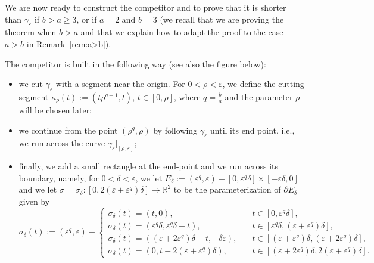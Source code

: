 \documentclass[12pt]{amsart}
\theoremstyle{plain}
\theoremstyle{definition}
\theoremstyle{remark}
\numberwithin{equation}{section}
\newcommand{\R}{\mathbb{R}}
\newcommand{\<}{\langle}
\renewcommand{\>}{\rangle}
\newcommand{\e}{\varepsilon}
\newcommand{\s}{\sigma}
\newcommand{\0}{\theta}
\renewcommand{\d}{\partial}
\renewcommand{\k}{\kappa}
\newcommand{\g}{\gamma}
\newcommand{\de}{\delta}
\newcommand{\1}{{-1}}
\renewcommand{\=}{\coloneqq}
\renewcommand{\.}{\dots}
\renewcommand{\-}{\cdot}
\renewcommand{\:}{\,:\,}
\renewcommand{\k}{\mathrm k}
\renewcommand{\k}{\kappa}
\theoremstyle{definition}
\begin{document}
We are now ready to construct the competitor and to prove that it is shorter than $\g_\e$ if $b>a\geq3$, or if $a=2$ and $b=3$ (we recall that we are proving the theorem when $b>a$ and that we explain how to adapt the proof to the case $a>b$ in Remark~\ref{rem:a>b}). 

The competitor is built in the following way (see also the figure below):
\begin{itemize}
	\item[i)] we cut $\g_\e$ with a segment near the origin. For $0<\rho<\e$, we define the cutting segment $\k_\rho(t):=(t\rho^{q-1},t)$, $t\in[0,\rho]$, where $q=\frac ba$ and the parameter $\rho$ will be chosen later;
	\item[ii)] we continue from the point $(\rho^q,\rho)$ by following $\g_\e$ until its end point, i.e., we run across the curve $\g_\e|_{[\rho,\e]}$;
	\item[iii)] finally, we add a small rectangle at the end-point and we run across its boundary, namely, for $0<\de<\e$, we let $E_\de:=(\e^q,\e)+[0,\e^q\de]\times[-\e\de,0]$ and we let $\s=\s_\de:[0,2(\e+\e^q)\de]\to\R^2$ to be the parameterization of $\d E_\de$ given by
	\begin{equation}
		\s_\de(t):=(\e^q,\e)+
		\begin{cases}
			\s_\de(t)= (t,0), \quad &t\in[0,\e^q\de],\\
			\s_\de(t)= (\e^q\de,\e^q\de-t), \quad &t\in[\e^q\de,(\e+\e^q)\de],\\
			\s_\de(t)= ((\e+2\e^q)\de-t,-\de\e), \quad &t\in[(\e+\e^q)\de,(\e+2\e^q)\de],\\
			\s_\de(t)= (0,t-2(\e+\e^q)\de), \quad & t\in[(\e+2\e^q)\de,2(\e+\e^q)\de].
		\end{cases}
	\end{equation} 
\end{itemize}
\end{document}
